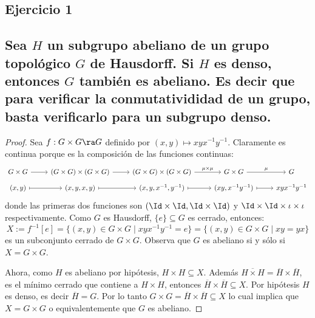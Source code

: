 \subsection*{Ejercicio 1}
\subsection*{%
  Sea $H$ un subgrupo abeliano de un grupo topol\'ogico $G$ de Hausdorff. Si $H$ es denso, entonces $G$ tambi\'en
  es abeliano. Es decir que para verificar la conmutativididad de un grupo, basta verificarlo para un subgrupo
  denso.
} 

\begin{proof}%
  Sea $f:G\times G\ra G$ definido por $(x,y)\mapsto xyx^{-1}y^{-1}$. Claramente es continua porque
  es la composici\'on de las funciones continuas:
  \[
    \begin{tikzcd}[row sep=5]
      G\times G \arrow[r] &
      (G\times G)\times(G\times G) \arrow[r] &
      (G\times G)\times(G\times G) \arrow[r,"\mu\times\mu"] &
      G\times G \arrow[r,"\mu"] &
      G
      \\
      (x,y) \arrow[r,mapsto] &
      (x,y,x,y) \arrow[r,mapsto] &
      (x,y,x^{-1},y^{-1}) \arrow[r,mapsto] &
      (xy,x^{-1}y^{-1}) \arrow[r,mapsto] &
      xyx^{-1}y^{-1}
    \end{tikzcd}
  \]
  donde las primeras dos funciones son $(\Id\times\Id,\Id\times\Id)$ y
  $\Id\times\Id\times\iota\times\iota$ respectivamente.
  Como $G$ es Hausdorff, $\{e\}\subseteq G$ es cerrado, entonces:
  \[
    X:=f^{-1}[e]=\{(x,y)\in G\times G\mid xyx^{-1}y^{-1}=e\}=\{(x,y)\in G\times G\mid xy=yx\}
  \]
  es un subconjunto cerrado de $G\times G$. Observa que $G$ es abeliano si y s\'olo si
  $X=G\times G$.

  Ahora, como $H$ es abeliano por hip\'otesis,
  $H\times H\subseteq X$. Adem\'as $\overline{H\times H}=\overline{H}\times\overline{H}$,
  es el m\'inimo cerrado que contiene a $H\times H$, entonces
  $\overline{H}\times\overline{H}\subseteq X$. Por hip\'otesis $H$ es denso, es decir $\overline{H}=G$.
  Por lo tanto $G\times G=\overline{H}\times\overline{H}\subseteq X$ lo cual implica que $X=G\times G$
  o equivalentemente que $G$ es abeliano.
  
\end{proof}%

